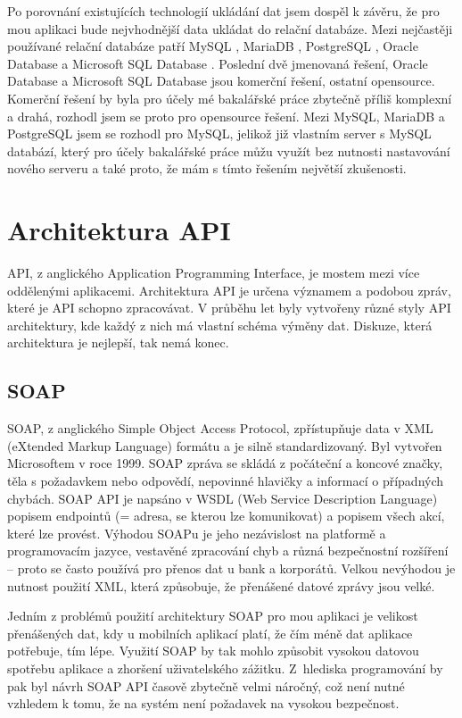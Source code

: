 Po porovnání existujících technologií ukládání dat jsem dospěl k závěru, že pro mou aplikaci bude nejvhodnější data ukládat do relační databáze. Mezi nejčastěji používané relační databáze patří MySQL \cite{mysql}, MariaDB \cite{mariadb}, PostgreSQL \cite{postgresql}, Oracle Database \cite{oracle} a Microsoft SQL Database \cite{mssql}. Poslední dvě jmenovaná řešení, Oracle Database a Microsoft SQL Database jsou komerční řešení, ostatní opensource. Komerční řešení by byla pro účely mé bakalářské práce zbytečně příliš komplexní a drahá, rozhodl jsem se proto pro opensource řešení. Mezi MySQL, MariaDB a PostgreSQL jsem se rozhodl pro MySQL, jelikož již vlastním server s MySQL databází, který pro účely bakalářské práce můžu využít bez nutnosti nastavování nového serveru a také proto, že mám s tímto řešením největší zkušenosti.

\section{Architektura API}

API, z anglického Application Programming Interface, je mostem mezi více oddělenými aplikacemi. Architektura API je určena významem a podobou zpráv, které je API schopno zpracovávat. V průběhu let byly vytvořeny různé styly API architektury, kde každý z nich má vlastní schéma výměny dat. Diskuze, která architektura je nejlepší, tak nemá konec. \cite{altexsoft}

\subsection{SOAP}

SOAP, z anglického Simple Object Access Protocol, zpřístupňuje data v XML (eXtended Markup Language) formátu a je silně standardizovaný. Byl vytvořen Microsoftem v roce 1999. SOAP zpráva se skládá z počáteční a koncové značky, těla s požadavkem nebo odpovědí, nepovinné hlavičky a informací o případných chybách. SOAP API je napsáno v WSDL (Web Service Description Language) popisem endpointů (= adresa, se kterou lze komunikovat) a popisem všech akcí, které lze provést. Výhodou SOAPu je jeho nezávislost na platformě a programovacím jazyce, vestavěné zpracování chyb a různá bezpečnostní rozšíření -- proto se často používá pro přenos dat u bank a korporátů. Velkou nevýhodou je nutnost použití XML, která způsobuje, že přenášené datové zprávy jsou velké. \cite{altexsoft}

Jedním z problémů použití architektury SOAP pro mou aplikaci je velikost přenášených dat, kdy u mobilních aplikací platí, že čím méně dat aplikace potřebuje, tím lépe. Využití SOAP by tak mohlo způsobit vysokou datovou spotřebu aplikace a zhoršení uživatelského zážitku. Z~hlediska programování by pak byl návrh SOAP API časově zbytečně velmi náročný, což není nutné vzhledem k tomu, že na systém není požadavek na vysokou bezpečnost.

